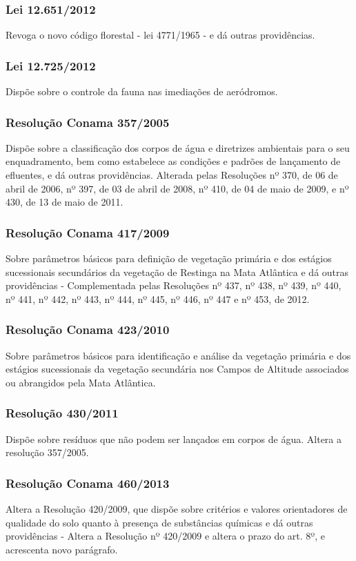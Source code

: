 \begin{subapend}
\begin{subsubapend}
		\subsubsection{Lei 12.651/2012}
		Revoga o novo código florestal - lei 4771/1965 -  e dá outras providências.
		\subsubsection{Lei 12.725/2012}
		Dispõe sobre o controle da fauna nas imediações de aeródromos.
		\subsubsection{Resolução Conama 357/2005}
		Dispõe sobre a classificação dos corpos de água e diretrizes ambientais para o seu enquadramento, bem como estabelece as condições e padrões de lançamento de efluentes, e dá outras providências. Alterada pelas Resoluções nº 370, de 06 de abril de 2006, nº 397, de 03 de abril de 2008, nº 410, de 04 de maio de 2009, e nº 430, de 13 de maio de 2011.
		\subsubsection{Resolução Conama 417/2009}
		Sobre parâmetros básicos para definição de vegetação primária e dos estágios sucessionais secundários da vegetação de Restinga na Mata Atlântica e dá outras providências - Complementada pelas Resoluções nº 437, nº 438, nº 439, nº 440, nº 441, nº 442, nº 443, nº 444, nº 445, nº 446, nº 447 e nº 453, de 2012.
		\subsubsection{Resolução Conama 423/2010}
		Sobre parâmetros básicos para identificação e análise da vegetação primária e dos estágios sucessionais da vegetação secundária nos Campos de Altitude associados ou abrangidos pela Mata Atlântica.
		\subsubsection{Resolução 430/2011}
		Dispõe sobre resíduos que não podem ser lançados em corpos de água.  Altera a resolução 357/2005.
		\subsubsection{Resolução Conama 460/2013}
		Altera a Resolução 420/2009, que dispõe sobre critérios e valores orientadores de qualidade do solo quanto à presença de substâncias químicas e dá outras providências - Altera a Resolução  nº 420/2009 e altera o prazo do art. 8º, e acrescenta novo parágrafo.

\end{subsubapend}
\end{subapend}
